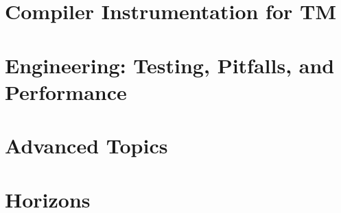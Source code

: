 \documentclass[12pt,a4paper,openany]{book}
\begin{document}
\part{Compiler Instrumentation for TM}



\part{Engineering: Testing, Pitfalls, and Performance}




\part{Advanced Topics}





\part{Horizons}


\appendix










\backmatter



\printindex
\end{document}
